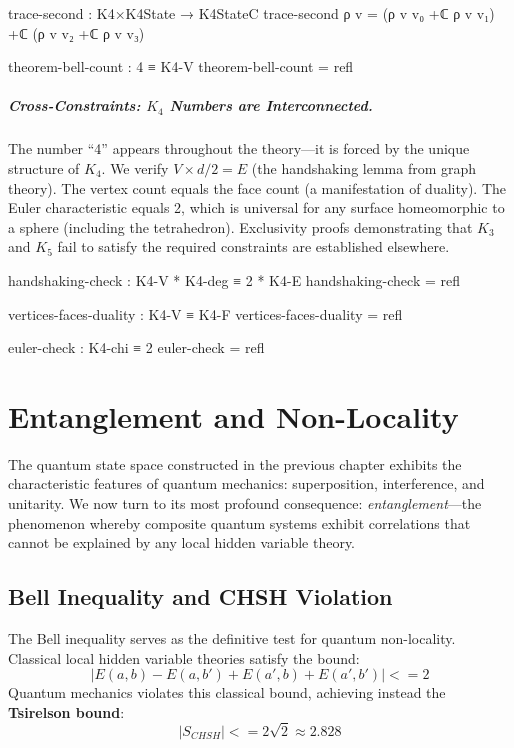 \documentclass[11pt,a4paper]{book}
\def\leq{<=}%
\def\text#1{#1}%
\begin{document}
\begin{code}
trace-second : K4×K4State → K4StateC
trace-second ρ v = (ρ v v₀ +ℂ ρ v v₁) +ℂ (ρ v v₂ +ℂ ρ v v₃)

theorem-bell-count : 4 ≡ K4-V
theorem-bell-count = refl
\end{code}

\paragraph{Cross-Constraints: $K_4$ Numbers are Interconnected.}
The number ``4'' appears throughout the theory---it is forced by the unique structure of $K_4$. We verify $V \times d / 2 = E$ (the handshaking lemma from graph theory). The vertex count equals the face count (a manifestation of duality). The Euler characteristic equals 2, which is universal for any surface homeomorphic to a sphere (including the tetrahedron). Exclusivity proofs demonstrating that $K_3$ and $K_5$ fail to satisfy the required constraints are established elsewhere.

\begin{code}
handshaking-check : K4-V * K4-deg ≡ 2 * K4-E
handshaking-check = refl

vertices-faces-duality : K4-V ≡ K4-F
vertices-faces-duality = refl

euler-check : K4-chi ≡ 2
euler-check = refl
\end{code}

\chapter{Entanglement and Non-Locality}
\label{chap:entanglement}

The quantum state space constructed in the previous chapter exhibits the characteristic features of quantum mechanics: superposition, interference, and unitarity. We now turn to its most profound consequence: \emph{entanglement}---the phenomenon whereby composite quantum systems exhibit correlations that cannot be explained by any local hidden variable theory.

\section{Bell Inequality and CHSH Violation}

The Bell inequality serves as the definitive test for quantum non-locality. Classical 
local hidden variable theories satisfy the bound:
\[
|E(a,b) - E(a,b') + E(a',b) + E(a',b')| \leq 2
\]
Quantum mechanics violates this classical bound, achieving instead the \textbf{Tsirelson bound}:
\[
|S_{\text{CHSH}}| \leq 2\sqrt{2} \approx 2.828
\]
\end{document}
